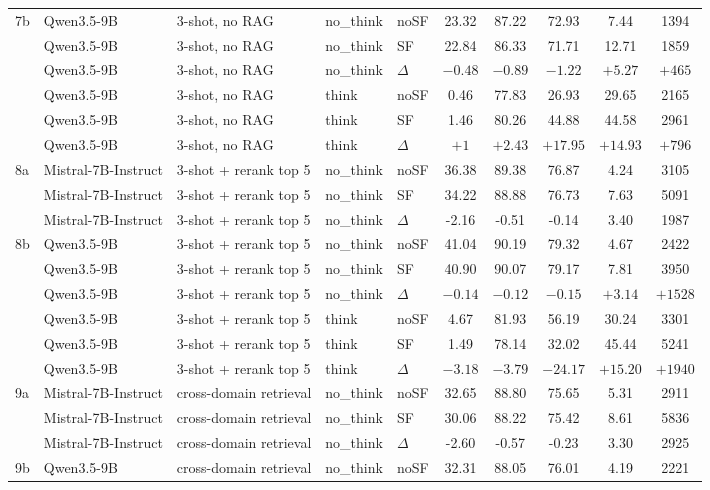 \begin{scriptsize}
\begin{longtable}{l l l l l c c c c c}
7b & Qwen3.5-9B & 3-shot, no RAG & no\_think & noSF & 23.32 & 87.22 & 72.93 & 7.44 & 1394 \\
 & Qwen3.5-9B & 3-shot, no RAG & no\_think & SF & 22.84 & 86.33 & 71.71 & 12.71 & 1859 \\
 & Qwen3.5-9B & 3-shot, no RAG & no\_think & $\Delta$ & $-0.48$ & $-0.89$ & $-1.22$ & $+5.27$ & $+465$ \\
 & Qwen3.5-9B & 3-shot, no RAG & think & noSF & 0.46 & 77.83 & 26.93 & 29.65 & 2165 \\
 & Qwen3.5-9B & 3-shot, no RAG & think & SF & 1.46 & 80.26 & 44.88 & 44.58 & 2961 \\
 & Qwen3.5-9B & 3-shot, no RAG & think & $\Delta$ & $+1$ & $+2.43$ & $+17.95$ & $+14.93$ & $+796$ \\
\dmidrule
\rowcolor{tabhighlight}8a & Mistral-7B-Instruct & 3-shot + rerank top 5 & no\_think & noSF & 36.38 & 89.38 & 76.87 & 4.24 & 3105 \\
 & Mistral-7B-Instruct & 3-shot + rerank top 5 & no\_think & SF & 34.22 & 88.88 & 76.73 & 7.63 & 5091 \\
 & Mistral-7B-Instruct & 3-shot + rerank top 5 & no\_think & $\Delta$ & -2.16 & -0.51 & -0.14 & 3.40 & 1987 \\
8b & Qwen3.5-9B & 3-shot + rerank top 5 & no\_think & noSF & 41.04 & 90.19 & 79.32 & 4.67 & 2422 \\
 & Qwen3.5-9B & 3-shot + rerank top 5 & no\_think & SF & 40.90 & 90.07 & 79.17 & 7.81 & 3950 \\
 & Qwen3.5-9B & 3-shot + rerank top 5 & no\_think & $\Delta$ & $-0.14$ & $-0.12$ & $-0.15$ & $+3.14$ & $+1528$ \\
 & Qwen3.5-9B & 3-shot + rerank top 5 & think & noSF & 4.67 & 81.93 & 56.19 & 30.24 & 3301 \\
 & Qwen3.5-9B & 3-shot + rerank top 5 & think & SF & 1.49 & 78.14 & 32.02 & 45.44 & 5241 \\
 & Qwen3.5-9B & 3-shot + rerank top 5 & think & $\Delta$ & $-3.18$ & $-3.79$ & $-24.17$ & $+15.20$ & $+1940$ \\
\dmidrule
9a & Mistral-7B-Instruct & cross-domain retrieval & no\_think & noSF & 32.65 & 88.80 & 75.65 & 5.31 & 2911 \\
 & Mistral-7B-Instruct & cross-domain retrieval & no\_think & SF & 30.06 & 88.22 & 75.42 & 8.61 & 5836 \\
 & Mistral-7B-Instruct & cross-domain retrieval & no\_think & $\Delta$ & -2.60 & -0.57 & -0.23 & 3.30 & 2925 \\
9b & Qwen3.5-9B & cross-domain retrieval & no\_think & noSF & 32.31 & 88.05 & 76.01 & 4.19 & 2221 \\

\end{longtable}
\end{scriptsize}
